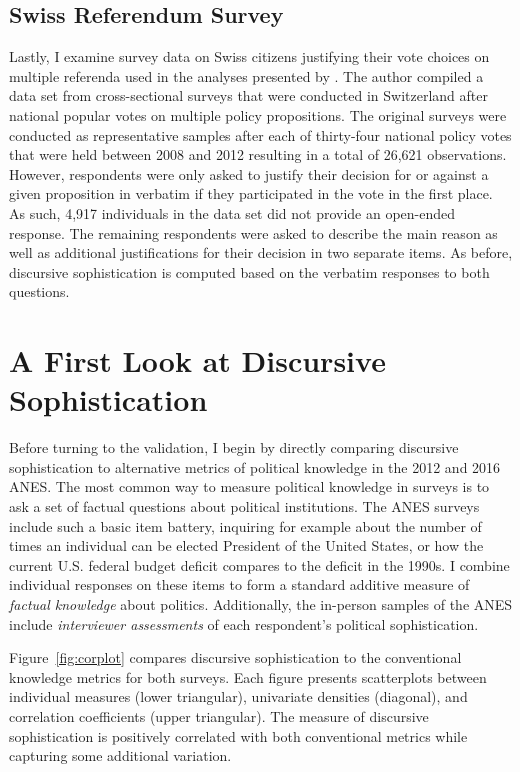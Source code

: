 \subsection*{Swiss Referendum Survey}
Lastly, I examine survey data on Swiss citizens justifying their vote choices on multiple referenda used in the analyses presented by \citet{colombo2016justifications}. The author compiled a data set from cross-sectional surveys that were conducted in Switzerland after national popular votes on multiple policy propositions. The original surveys were conducted as representative samples after each of thirty-four national policy votes that were held between 2008 and 2012 resulting in a total of 26,621 observations. However, respondents were only asked to justify their decision for or against a given proposition in verbatim if they participated in the vote in the first place. As such, 4,917 individuals in the data set did not provide an open-ended response. The remaining respondents were asked to describe the main reason as well as additional justifications for their decision in two separate items. As before, discursive sophistication is computed based on the verbatim responses to both questions.



\section*{A First Look at Discursive Sophistication}

Before turning to the validation, I begin by directly comparing discursive sophistication to alternative metrics of political knowledge in the 2012 and 2016 ANES. The most common way to measure political knowledge in surveys is to ask a set of factual questions about political institutions. The ANES surveys include such a basic item battery, inquiring for example about the number of times an individual can be elected President of the United States, or how the current U.S. federal budget deficit compares to the deficit in the 1990s. I combine individual responses on these items to form a standard additive measure of \textit{factual knowledge} about politics. Additionally, the in-person samples of the ANES include \textit{interviewer assessments} of each respondent's political sophistication.

Figure~\ref{fig:corplot} compares discursive sophistication to the conventional knowledge metrics for both surveys. Each figure presents scatterplots between individual measures (lower triangular), univariate densities (diagonal), and correlation coefficients (upper triangular). The measure of discursive sophistication is positively correlated with both conventional metrics while capturing some additional variation.

